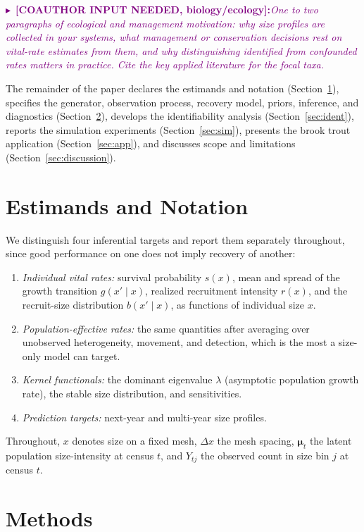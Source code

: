 \documentclass[11pt]{article}
\newcommand{\needbio}[1]{%
  \par\smallskip\noindent%
  \textcolor{purple}{$\blacktriangleright$~\textbf{[COAUTHOR INPUT NEEDED, biology/ecology]:}\space\textit{#1}}%
  \par\smallskip}
\begin{document}
\needbio{One to two paragraphs of ecological and management motivation:
why size profiles are collected in your systems, what management or conservation
decisions rest on vital-rate estimates from them, and why distinguishing
identified from confounded rates matters in practice. Cite the key applied
literature for the focal taxa.}

The remainder of the paper declares the estimands and notation
(Section~\ref{sec:estimands}), specifies the generator, observation process,
recovery model, priors, inference, and diagnostics (Section~\ref{sec:methods}),
develops the identifiability analysis (Section~\ref{sec:ident}), reports the
simulation experiments (Section~\ref{sec:sim}), presents the brook trout
application (Section~\ref{sec:app}), and discusses scope and limitations
(Section~\ref{sec:discussion}).

\section{Estimands and Notation}
\label{sec:estimands}

We distinguish four inferential targets and report them separately throughout,
since good performance on one does not imply recovery of another:
\begin{enumerate}
  \item \textit{Individual vital rates:} survival probability $s(x)$, mean and
  spread of the growth transition $g(x'\mid x)$, realized recruitment intensity
  $r(x)$, and the recruit-size distribution $b(x'\mid x)$, as functions of
  individual size $x$.
  \item \textit{Population-effective rates:} the same quantities after averaging
  over unobserved heterogeneity, movement, and detection, which is the most a
  size-only model can target.
  \item \textit{Kernel functionals:} the dominant eigenvalue $\lambda$ (asymptotic
  population growth rate), the stable size distribution, and sensitivities.
  \item \textit{Prediction targets:} next-year and multi-year size profiles.
\end{enumerate}
Throughout, $x$ denotes size on a fixed mesh, $\Delta x$ the mesh spacing,
$\boldsymbol{\mu}_t$ the latent population size-intensity at census $t$, and
$Y_{tj}$ the observed count in size bin $j$ at census $t$.

\section{Methods}
\label{sec:methods}
\end{document}
